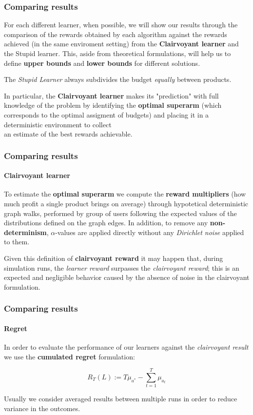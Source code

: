 
\begin{frame}

\frametitle{Comparing results}

For each different learner, when possible, we will show our results through the comparison of the rewards obtained by each algorithm against the rewards achieved (in the same enviroment setting) from the \textbf{Clairvoyant learner} and the Stupid learner.
This, aside from theoretical formulations, will help us to define \textbf{upper bounds} and \textbf{lower bounds} for different solutions.

The \textit{Stupid Learner} always subdivides the budget \textit{equally} between products.

In particular, the \textbf{Clairvoyant learner} makes its "prediction" with full knowledge of the problem by identifying the \textbf{optimal superarm} (which corresponds to the optimal assigment of budgets) and placing it in a deterministic environment to collect \\ an estimate of the best rewards achievable.

\end{frame}


\begin{frame}

\frametitle{Comparing results}
\framesubtitle{Clairvoyant learner}

To estimate the \textbf{optimal superarm} we compute the \textbf{reward multipliers} (how much profit a single product brings on average) through hypotetical deterministic graph walks, performed by group of users following the expected values of the distributions defined on the graph edges.
In addition, to remove any \textbf{non-determinism}, $\alpha$-values are applied directly without any \textit{Dirichlet noise} applied to them.

Given this definition of \textbf{clairvoyant reward} it may happen that, during simulation runs, the \textit{learner reward} surpasses the \textit{clairvoyant reward}; this is an expected and negligible behavior caused by the absence of noise in the clairvoyant formulation.

\end{frame}


\begin{frame}

\frametitle{Comparing results}
\framesubtitle{Regret}

In order to evaluate the performance of our learners against the \textit{clairvoyant result} we use the \textbf{cumulated regret} formulation:

\begin{displaymath}
    R_T(L) := T\mu_{a^*} - \sum_{t = 1}^T \mu_{a_t}
\end{displaymath}

Usually we consider averaged results between multiple runs in order to reduce variance in the outcomes.

\end{frame}

